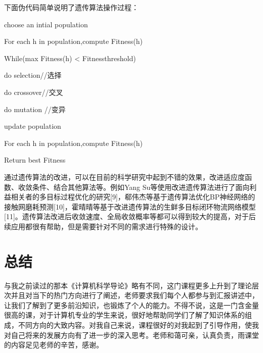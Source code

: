 \documentclass{article}
\begin{document}
下面伪代码简单说明了遗传算法操作过程：

{choose an intial population

For each h in population,compute Fitness(h)

While(max Fitness(h) < Fitnessthreshold)

do selection//选择

do crossover//交叉

do mutation  //变异

update population

For each h in population,compute Fitness(h)

Return best Fitness}

通过遗传算法的改进，可以在目前的科学研究中起到不错的效果，改进适应度函数、收敛条件、结合其他算法等。例如Yang Su等使用改进遗传算法进行了面向利益相关者的多目标过程优化的研究[9]，郗伟杰等基于遗传算法优化BP神经网络的接触网磨耗预测[10]，霍晴晴等基于改进遗传算法的生鲜多目标闭环物流网络模型[11]。遗传算法改进后收敛速度、全局收敛概率等都可以得到较大的提高，对于后续应用都很有帮助，但是需要针对不同的需求进行特殊的设计。
\par

\section{总结}
与我之前读过的那本《计算机科学导论》略有不同，这门课程更多上升到了理论层次并且对当下的热门方向进行了阐述，老师要求我们每个人都参与到汇报讲述中，让我们了解到了更多前沿知识，也锻炼了个人的能力。不得不说，这是一门含金量很高的课，对于计算机专业的学生来说，很好地帮助同学们了解了知识体系的组成，不同方向的大致内容。对我自己来说，课程很好的对我起到了引导作用，使我对自己将来的发展方向有了进一步的深入思考。老师和蔼可亲，认真负责，雨课堂的内容足见老师的辛苦，感谢。\par
\end{document}
